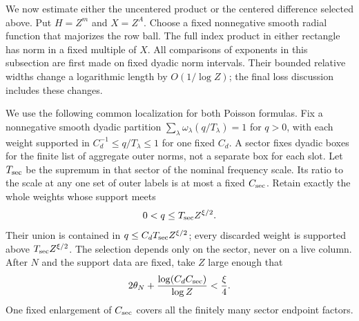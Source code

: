 \documentclass[11pt,a4paper]{article}
\numberwithin{equation}{section}
\numberwithin{figure}{section}
\theoremstyle{definition}
\theoremstyle{remark}
\begin{document}
We now estimate either the uncentered product or the centered
difference selected above.  Put \(H=Z^m\) and \(X=Z^A\).  Choose a
fixed nonnegative smooth radial function that majorizes the row ball.
The full index product in either rectangle has norm in a fixed
multiple of \(X\).  All comparisons of exponents in this subsection
are first made on fixed dyadic norm intervals.  Their bounded
relative widths change a logarithmic length by \(O(1/\log Z)\);
the final loss discussion includes these changes.

We use the following common localization for both Poisson formulas.
Fix a nonnegative smooth dyadic partition
\(\sum_\lambda\omega_\lambda(q/T_\lambda)=1\) for \(q>0\),
with each weight supported in \(C_d^{-1}\le q/T_\lambda\le1\)
for one fixed \(C_d\).  A
sector fixes dyadic boxes for the finite list of aggregate outer norms,
not a separate box for each slot.  Let \(T_{\rm sec}\) be the
supremum in that sector of the nominal frequency scale.  Its ratio to
the scale at any one set of outer labels is at most a fixed
\(C_{\rm sec}\).  Retain exactly the whole weights whose support
meets
\[
 0<q\le T_{\rm sec}Z^{\xi/2}.
\]
Their union is contained in \(q\le C_dT_{\rm sec}Z^{\xi/2}\);
every discarded weight is supported above \(T_{\rm sec}Z^{\xi/2}\).
The selection depends only on the sector, never on a live column.
After \(N\) and the support data are fixed, take \(Z\) large enough
that
\begin{equation}
 2\theta_N+\frac{\log(C_dC_{\rm sec})}{\log Z}<\frac\xi4.
 \label{eq:centered-localization-threshold}
\end{equation}
One fixed enlargement of \(C_{\rm sec}\) covers all the finitely many
sector endpoint factors.
\end{document}

